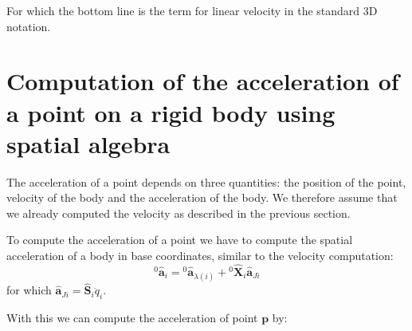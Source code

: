 \documentclass[a4paper]{article}
\newcommand{\Spa}[1]{\mathbf{\hat{#1}}}
\newcommand{\Vec}[1]{\mathbf{#1}}
\begin{document}
For which the bottom line is the term for linear velocity in the standard 3D
notation.

\section{Computation of the acceleration of a point on a rigid body using
spatial algebra}

The acceleration of a point depends on three quantities: the position of the
point, velocity of the body and the acceleration of the body. We therefore
assume that we already computed the velocity as described in the previous
section.

To compute the acceleration of a point we have to compute the spatial acceleration of a
body in base coordinates, similar to the velocity computation:
\begin{equation}
	{}^0\Spa{a}_i = {}^0\Spa{a}_{\lambda(i)} + {}^{0}\Spa{X}_{i} \Spa{a}_{Ji}
\end{equation}
for which $\Spa{a}_{Ji} = \Spa{S}_i \ddot{q}_i$.

With this we can compute the acceleration of point $\Vec{p}$ by:
\end{document}
